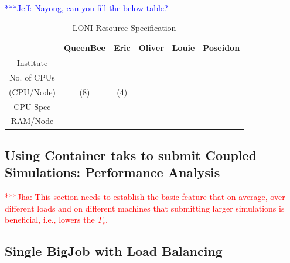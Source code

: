\documentclass[conference,final]{IEEEtran}
\newcommand{\jhanote}[1]{ {\textcolor{red} { ***Jha: #1 }}}
\newcommand{\skonote}[1]{ {\textcolor{blue} { ***Jeff: #1 }}}
\newcommand{\jhanote}[1]{}
\newcommand{\skonote}[1]{}
\newcommand{\ts}{$T_{s}$}
\begin{document}

\skonote{Nayong, can you fill the below table?}


\setlength{\tabcolsep}{1pt}
\begin{table}[!ht]
\begin{center}

\caption{\small LONI Resource Specification}
\label{table:LONI_resource}

\begin{tabular}{ c || c | c | c | c | c}

\hline
 & QueenBee & Eric & Oliver & Louie & Poseidon \\
\hline
\hline
Institute &  &  &  &  & \\
\hline
No. of CPUs &  &  \\
(CPU/Node) & (8) & (4) \\
\hline
CPU Spec &  &  \\
\hline
RAM/Node &  &  \\
\hline

\end{tabular}

\end{center}
\end{table}

\subsection{Using Container taks to submit Coupled Simulations:
  Performance Analysis}

\jhanote{This section needs to establish the basic feature that on
  average, over different loads and on different machines that
  submitting larger simulations is beneficial, i.e., lowers the \ts.}


\subsection{Single BigJob with Load Balancing}
\end{document}
